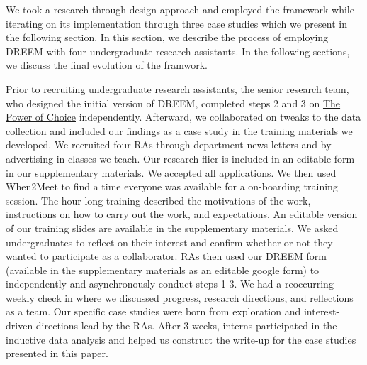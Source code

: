 We took a research through design approach and employed the framework while iterating on its implementation through three case studies which we present in the following section. In this section, we describe the process of employing DREEM with four undergraduate research assistants. In the following sections, we discuss the final evolution of the framwork.

Prior to recruiting undergraduate research assistants, the senior research team, who designed the initial version of DREEM, completed steps 2 and 3 on \href{https://www.youtube.com/watch?v=B1sWtT-wShI}{The Power of Choice} independently. Afterward, we collaborated on tweaks to the data collection and included our findings as a case study in the training materials we developed. We recruited four RAs through department news letters and by advertising in classes we teach. Our research flier is included in an editable form in our supplementary materials. We accepted all applications. We then used When2Meet to find a time everyone was available for a on-boarding training session. The hour-long training described the motivations of the work, instructions on how to carry out the work, and expectations. An editable version of our training slides are available in the supplementary materials. We asked undergraduates to reflect on their interest and confirm whether or not they wanted to participate as a collaborator. RAs then used our DREEM form (available in the supplementary materials as an editable google form) to independently and asynchronously conduct steps 1-3. We had a reoccurring weekly check in where we  discussed progress, research directions, and reflections as a team. Our specific case  studies were born from exploration and interest-driven directions lead by the RAs. After 3 weeks, interns participated in the inductive data analysis and helped us construct the write-up for the case studies presented in this paper.

